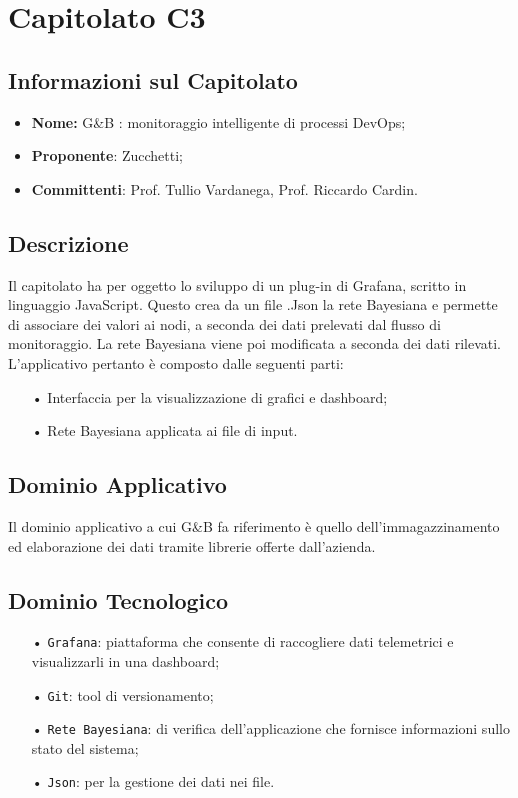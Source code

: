 \section{Capitolato C3}

\subsection{Informazioni sul Capitolato}

\begin{itemize}
	\item \textbf{Nome:} G\&{B} : monitoraggio intelligente di processi DevOps;
	\item \textbf{Proponente}: Zucchetti;
	\item \textbf{Committenti}: Prof. Tullio Vardanega, Prof. Riccardo Cardin.
\end{itemize}

\subsection{Descrizione}
Il capitolato ha per oggetto lo sviluppo di un plug-in di Grafana, scritto in linguaggio JavaScript. Questo crea da un file .Json la rete Bayesiana e permette di associare dei valori ai nodi, a seconda dei dati prelevati dal {flusso} di monitoraggio.
La rete Bayesiana viene poi modificata a seconda dei dati rilevati. 
L'applicativo pertanto è composto dalle seguenti parti: 

\begin{itemize}

\item[•] Interfaccia per la visualizzazione di grafici e dashboard;
\item[•] Rete Bayesiana applicata ai file di input.

\end{itemize}

\subsection{Dominio Applicativo}
Il dominio applicativo a cui G\&{B} fa riferimento è quello dell'immagazzinamento ed elaborazione dei dati tramite librerie offerte dall'azienda. 

\subsection{Dominio Tecnologico}
\begin{itemize}

\item[•] \texttt{Grafana}: piattaforma che consente di raccogliere dati telemetrici e visualizzarli in una dashboard;
\item[•] \texttt{Git}: tool di versionamento;
\item[•] \texttt{Rete Bayesiana}: di verifica dell'applicazione che fornisce informazioni sullo stato del sistema;
\item[•] \texttt{Json}: per la gestione dei dati nei file.

\end{itemize}

